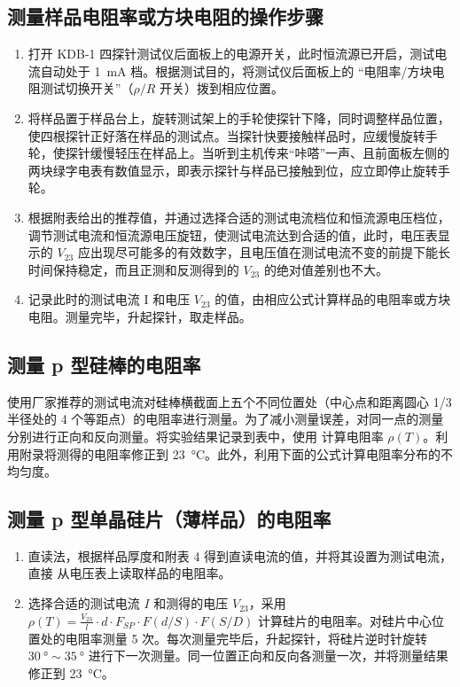     \subsection{测量样品电阻率或方块电阻的操作步骤}
    \begin{enumerate}
        \item 打开 KDB-1 四探针测试仪后面板上的电源开关，此时恒流源已开启，测试电流自动处于 \SI{1}{\milli\ampere} 档。根据测试目的，将测试仪后面板上的 “电阻率/方块电阻测试切换开关”（$\rho/R$ 开关）拨到相应位置。
        \item 将样品置于样品台上，旋转测试架上的手轮使探针下降，同时调整样品位置，使四根探针正好落在样品的测试点。当探针快要接触样品时，应缓慢旋转手轮，使探针缓慢轻压在样品上。当听到主机传来“咔嗒”一声、且前面板左侧的两块绿字电表有数值显示，即表示探针与样品已接触到位，应立即停止旋转手轮。
        \item 根据附表给出的推荐值，并通过选择合适的测试电流档位和恒流源电压档位，调节测试电流和恒流源电压旋钮，使测试电流达到合适的值，此时，电压表显示的 $V_{23}$ 应出现尽可能多的有效数字，且电压值在测试电流不变的前提下能长时间保持稳定，而且正测和反测得到的 $V_{23}$ 的绝对值差别也不大。
        \item 记录此时的测试电流 I 和电压 $V_{23}$ 的值，由相应公式计算样品的电阻率或方块电阻。测量完毕，升起探针，取走样品。
    \end{enumerate}
    \subsection{测量 p 型硅棒的电阻率}
        使用厂家推荐的测试电流对硅棒横截面上五个不同位置处（中心点和距离圆心 1/3 半径处的 4 个等距点）的电阻率进行测量。为了减小测量误差，对同一点的测量分别进行正向和反向测量。将实验结果记录到表中，使用 计算电阻率 $\rho (T)$。利用附录将测得的电阻率修正到 \SI{23}{\degreeCelsius}。此外，利用下面的公式计算电阻率分布的不均匀度。
    \subsection{测量 p 型单晶硅片（薄样品）的电阻率}
        \begin{enumerate}
            \item 直读法，根据样品厚度和附表 4 得到直读电流的值，并将其设置为测试电流，直接
            从电压表上读取样品的电阻率。
            \item 选择合适的测试电流 $I$ 和测得的电压 $V_{23}$，采用 $\rho(T)=\frac{V_{23}}l\cdot d\cdot F_{SP}\cdot F(d/S)\cdot F(S/D)$ 计算硅片的电阻率。对硅片中心位置处的电阻率测量 5 次。每次测量完毕后，升起探针，将硅片逆时针旋转 $\SI{30}{\degree} \sim  \SI{35}{\degree}$ 进行下一次测量。同一位置正向和反向各测量一次，并将测量结果修正到 \SI{23}{\degreeCelsius}。
        \end{enumerate}
